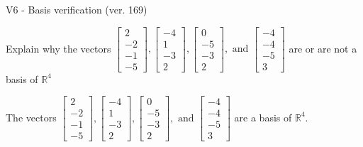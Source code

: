 \begin{exercise}
  \begin{exerciseTitle}V6 - Basis verification (ver. 169)\end{exerciseTitle}
  \begin{exerciseStatement}
    Explain why the vectors \(\left[\begin{array}{r}
2 \\
-2 \\
-1 \\
-5
\end{array}\right] , \left[\begin{array}{r}
-4 \\
1 \\
-3 \\
2
\end{array}\right] , \left[\begin{array}{r}
0 \\
-5 \\
-3 \\
2
\end{array}\right] , \text{ and } \left[\begin{array}{r}
-4 \\
-4 \\
-5 \\
3
\end{array}\right]\) are or are not a basis of \(\mathbb{R}^4\)	


  \end{exerciseStatement}
  \begin{exerciseAnswer}
   The vectors \(\left[\begin{array}{r}
2 \\
-2 \\
-1 \\
-5
\end{array}\right] , \left[\begin{array}{r}
-4 \\
1 \\
-3 \\
2
\end{array}\right] , \left[\begin{array}{r}
0 \\
-5 \\
-3 \\
2
\end{array}\right] , \text{ and } \left[\begin{array}{r}
-4 \\
-4 \\
-5 \\
3
\end{array}\right]\) 
  	 are  a basis of \(\mathbb{R}^4\).
  


  \end{exerciseAnswer}
\end{exercise}